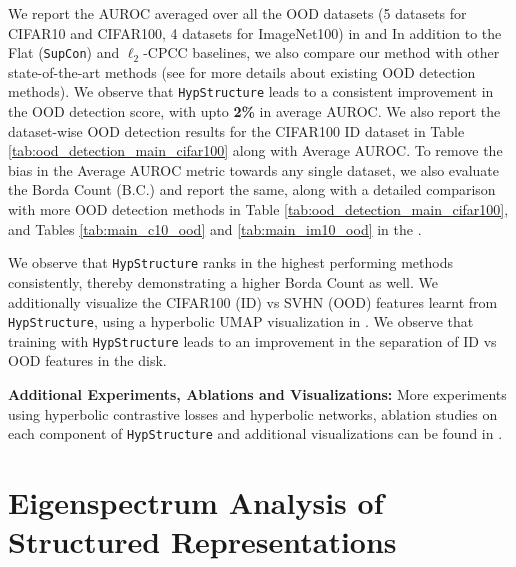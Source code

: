 We report the AUROC averaged over all the OOD datasets (5 datasets for CIFAR10 and CIFAR100, 4 datasets for ImageNet100) in  and  In addition to the Flat (\texttt{SupCon}) and $\ell_2$-CPCC baselines, we also compare our method with other state-of-the-art methods (see  for more details about existing OOD detection methods). We observe that \texttt{HypStructure} leads to a consistent improvement in the OOD detection score, with upto \textbf{2\%} in average AUROC. We also report the dataset-wise OOD detection results for the CIFAR100 ID dataset in Table \ref{tab:ood_detection_main_cifar100} along with Average AUROC. To remove the bias in the Average AUROC metric towards any single dataset, we also evaluate the Borda Count (B.C.) \citep{McLean_Urken_Hewitt_1995} and report the same, along with a detailed comparison with more OOD detection methods in Table \ref{tab:ood_detection_main_cifar100}, 
and Tables \ref{tab:main_c10_ood} and \ref{tab:main_im10_ood} in the .

We observe that \texttt{HypStructure} ranks in the highest performing methods consistently, thereby demonstrating a higher Borda Count as well. We additionally visualize the CIFAR100 (ID) vs SVHN (OOD) features learnt from \texttt{HypStructure}, using a hyperbolic UMAP visualization in . We observe that training with \texttt{HypStructure} leads to an improvement in the separation of ID vs OOD features in the \Poincare disk. 

\textbf{Additional Experiments,  Ablations and Visualizations:} More experiments using hyperbolic contrastive losses and hyperbolic networks, ablation studies on each component of \texttt{HypStructure} and additional visualizations can be found in .

\section{Eigenspectrum Analysis of Structured Representations}
\label{sec:eigenspectrum_theory}

